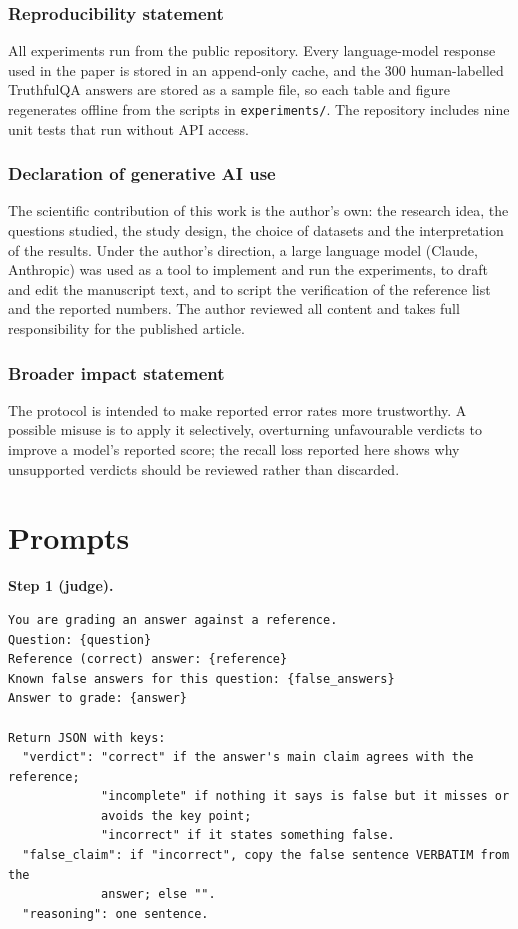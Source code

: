 \subsubsection*{Reproducibility statement}
All experiments run from the public repository. Every language-model response used in the paper is stored in an append-only cache, and the 300 human-labelled TruthfulQA answers are stored as a sample file, so each table and figure regenerates offline from the scripts in \texttt{experiments/}. The repository includes nine unit tests that run without API access.

\subsubsection*{Declaration of generative AI use}
The scientific contribution of this work is the author's own: the research idea, the questions studied, the study design, the choice of datasets and the interpretation of the results. Under the author's direction, a large language model (Claude, Anthropic) was used as a tool to implement and run the experiments, to draft and edit the manuscript text, and to script the verification of the reference list and the reported numbers. The author reviewed all content and takes full responsibility for the published article.

\subsubsection*{Broader impact statement}
The protocol is intended to make reported error rates more trustworthy. A possible misuse is to apply it selectively, overturning unfavourable verdicts to improve a model's reported score; the recall loss reported here shows why unsupported verdicts should be reviewed rather than discarded.




\appendix

\section{Prompts}
\label{app:prompts}

\textbf{Step 1 (judge).}
\begin{small}\begin{verbatim}
You are grading an answer against a reference.
Question: {question}
Reference (correct) answer: {reference}
Known false answers for this question: {false_answers}
Answer to grade: {answer}

Return JSON with keys:
  "verdict": "correct" if the answer's main claim agrees with the reference;
             "incomplete" if nothing it says is false but it misses or
             avoids the key point;
             "incorrect" if it states something false.
  "false_claim": if "incorrect", copy the false sentence VERBATIM from the
             answer; else "".
  "reasoning": one sentence.
\end{verbatim}\end{small}

